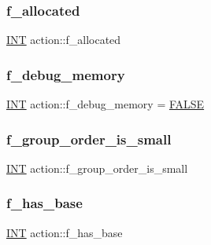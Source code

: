 \subsubsection{\texorpdfstring{f\+\_\+allocated}{f\_allocated}}
{\footnotesize\ttfamily \mbox{\hyperlink{galois_8h_a09fddde158a3a20bd2dcadb609de11dc}{I\+NT}} action\+::f\+\_\+allocated}

\mbox{\label{classaction_a7cd76822afdd1bacf81899f8b2237f7a}} 
\subsubsection{\texorpdfstring{f\+\_\+debug\+\_\+memory}{f\_debug\_memory}}
{\footnotesize\ttfamily \mbox{\hyperlink{galois_8h_a09fddde158a3a20bd2dcadb609de11dc}{I\+NT}} action\+::f\+\_\+debug\+\_\+memory = \mbox{\hyperlink{nauty_8h_aa93f0eb578d23995850d61f7d61c55c1}{F\+A\+L\+SE}}\hspace{0.3cm}{\ttfamily [static]}}

\mbox{\label{classaction_ae0b0e78c6409cba6484c36e76133dfe4}} 
\subsubsection{\texorpdfstring{f\+\_\+group\+\_\+order\+\_\+is\+\_\+small}{f\_group\_order\_is\_small}}
{\footnotesize\ttfamily \mbox{\hyperlink{galois_8h_a09fddde158a3a20bd2dcadb609de11dc}{I\+NT}} action\+::f\+\_\+group\+\_\+order\+\_\+is\+\_\+small}

\mbox{\label{classaction_afcbf810b8c83c29fa31fbd252bbd530e}} 
\subsubsection{\texorpdfstring{f\+\_\+has\+\_\+base}{f\_has\_base}}
{\footnotesize\ttfamily \mbox{\hyperlink{galois_8h_a09fddde158a3a20bd2dcadb609de11dc}{I\+NT}} action\+::f\+\_\+has\+\_\+base}

